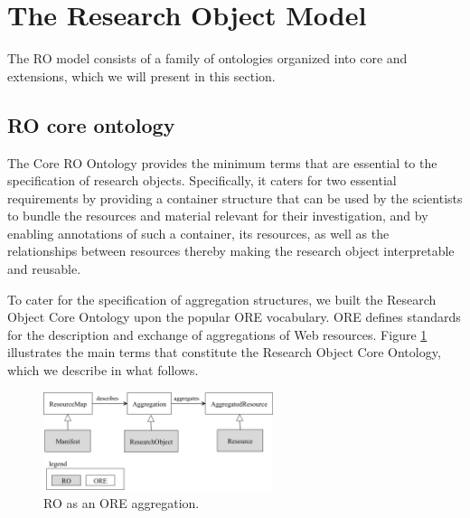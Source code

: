 \section{The Research Object Model}

The RO model consists of  a family of ontologies organized into core and extensions, which we will present in this section.

\subsection{RO core ontology} 
The Core RO Ontology provides the minimum terms that are essential to the specification of research objects. Specifically, it caters for two essential requirements by providing a container structure that can be used by the scientists to bundle the resources and material relevant for their investigation, and by enabling annotations of such a container, its resources, as well as the relationships between resources thereby making the research object interpretable and reusable. 

To cater for the specification of aggregation structures, we built the Research Object Core Ontology upon the popular ORE vocabulary. ORE defines standards for the description and exchange of aggregations of Web resources. 
Figure \ref{fig:ro_ontology} illustrates the main terms that constitute the Research Object Core Ontology, which we describe in what follows.


\begin{figure}[ht]
  \centering
  \includegraphics[width=0.6\textwidth]{Figures/ro_ontology_1.png}
  \caption{RO as an ORE aggregation.}
  \label{fig:ro_ontology}
\end{figure}

